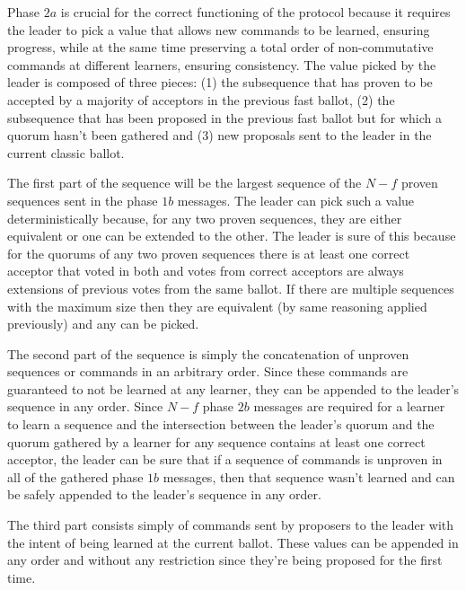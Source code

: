  Phase $2a$ is crucial for the correct functioning of the protocol because it requires the leader to pick a value that allows new commands to be learned, ensuring progress, while at the same time preserving a total order of non-commutative commands at different learners, ensuring consistency. The value picked by the leader is composed of three pieces: (1) the subsequence that has proven to be accepted by a majority of acceptors in the previous fast ballot, (2) the subsequence that has been proposed in the previous fast ballot but for which a quorum hasn't been gathered and (3) new proposals sent to the leader in the current classic ballot. \par
The first part of the sequence will be the largest sequence of the $N-f$ proven sequences sent in the phase $1b$ messages. The leader can pick such a value deterministically because, for any two proven sequences, they are either equivalent or one can be extended to the other. The leader is sure of this because for the quorums of any two proven sequences there is at least one correct acceptor that voted in both and votes from correct acceptors are always extensions of previous votes from the same ballot. If there are multiple sequences with the maximum size then they are equivalent (by same reasoning applied previously) and any can be picked. \par
The second part of the sequence is simply the concatenation of unproven sequences or commands in an arbitrary order. Since these commands are guaranteed to not be learned at any learner, they can be appended to the leader's sequence in any order. Since $N-f$ phase $2b$ messages are required for a learner to learn a sequence and the intersection between the leader's quorum and the quorum gathered by a learner for any sequence contains at least one correct acceptor, the leader can be sure that if a sequence of commands is unproven in all of the gathered phase $1b$ messages, then that sequence wasn't learned and can be safely appended to the leader's sequence in any order. \par 
The third part consists simply of commands sent by proposers to the leader with the intent of being learned at the current ballot. These values can be appended in any order and without any restriction since they're being proposed for the first time.


